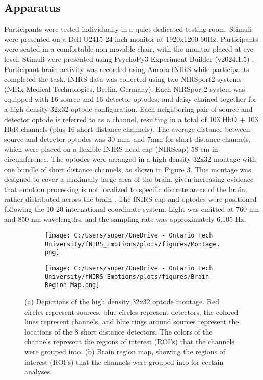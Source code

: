 \subsection{Apparatus}
Participants were tested individually in a quiet dedicated testing room. 
Stimuli were presented on a Dell U2415 24-inch monitor at 1920x1200 60Hz. 
Participants were seated in a comfortable non-movable chair, with the monitor placed at eye level. 
Stimuli were presented using PsychoPy3 Experiment Builder (v2024.1.5) \citep{peirce_psychopy2_2019}. 
Participant brain activity was recorded using Aurora fNIRS while participants completed the task. 
fNIRS data was collected using two NIRSport2 systems (NIRx Medical Technologies, Berlin, Germany). 
Each NIRSport2 system was equipped with 16 source and 16 detector optodes, and daisy-chained together for a high density 32x32 optode configuration. 
Each neighboring pair of source and detector optode is referred to as a channel, resulting in a total of 103 HbO + 103 HbR channels (plus 16 short distance channels).
The average distance between source and detector optodes was 30 mm, and 7mm for short distance channels, which were placed on a flexible fNIRS head cap (NIRScap) 58 cm in circumference. 
The optodes were arranged in a high density 32x32 montage with one bundle of short distance channels, as shown in Figure \ref{fig:montage_combined}.
This montage was designed to cover a maximally large area of the brain, given increasing evidence that emotion processing is not localized to specific discrete areas of the brain, rather distributed across the brain \citep{lindquist_brain_2012}. 
The fNIRS cap and optodes were positioned following the 10-20 international coordinate system.
Light was emitted at 760 nm and 850 nm wavelengths, and the sampling rate was approximately 6.105 Hz.

\begin{figure}[H]
    \centering
    \begin{subfigure}[b]{0.69\textwidth}
        \centering
        \texttt{[image: C:/Users/super/OneDrive - Ontario Tech University/fNIRS\_Emotions/plots/figures/Montage.png]}
        \caption[Montage depictions]{}
        \label{fig:montage}
    \end{subfigure}
    \hfill
    \begin{subfigure}[b]{0.3\textwidth}
        \centering
        \texttt{[image: C:/Users/super/OneDrive - Ontario Tech University/fNIRS\_Emotions/plots/figures/Brain Region Map.png]}
        \caption[Brain region map for ROI grouping]{}
        \label{fig:brain_region_map}
    \end{subfigure}
    \caption[Montage and brain region map]{(a) Depictions of the high density 32x32 optode montage. Red circles represent sources, blue circles represent detectors, the colored lines represent channels, and blue rings around sources represent the locations of the 8 short distance detectors.
        The colors of the channels represent the regions of interest (ROI's) that the channels were grouped into. (b) Brain region map, showing the regions of interest (ROI's) that the channels were grouped into for certain analyses.}
    \label{fig:montage_combined}
\end{figure}

